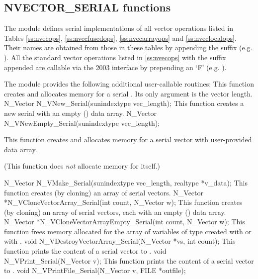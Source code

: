 \subsection{NVECTOR\_SERIAL functions}
\label{ss:nvec_ser_functions}

The {\nvecs} module defines serial implementations of all vector operations listed
in Tables \ref{ss:nvecops}, \ref{ss:nvecfusedops}, \ref{ss:nvecarrayops}
and \ref{ss:nveclocalops}. Their
names are obtained from those in these tables by appending the suffix 
(e.g. ).
All the standard vector operations listed in \ref{ss:nvecops} with the suffix
 appended are callable via the {\F} 2003 interface by prepending an
`F' (e.g. ).

The module {\nvecs} provides the following additional user-callable routines:
{
  This function creates and allocates memory for a serial .
  Its only argument is the vector length.
}
{
  N\_Vector N\_VNew\_Serial(sunindextype vec\_length);
}
{
  This function creates a new serial  with an empty ()
  data array.
}
{
  N\_Vector N\_VNewEmpty\_Serial(sunindextype vec\_length);
}
{
  This function creates and allocates memory for a serial vector
  with user-provided data array.

  (This function does {\em not} allocate memory for  itself.)
}
{
  N\_Vector N\_VMake\_Serial(sunindextype vec\_length, realtype *v\_data);
}
{
  This function creates (by cloning) an array of  serial vectors.
}
{
  N\_Vector *N\_VCloneVectorArray\_Serial(int count, N\_Vector w);
}
{
  This function creates (by cloning) an array of  serial vectors,
  each with an empty () data array.
}
{
  N\_Vector *N\_VCloneVectorArrayEmpty\_Serial(int count, N\_Vector w);
}
{
  This function frees memory allocated for the array of  variables of type
   created with  or with \newline
  .
}
{
  void N\_VDestroyVectorArray\_Serial(N\_Vector *vs, int count);
}
{
  This function prints the content of a serial vector to .
}
{
  void N\_VPrint\_Serial(N\_Vector v);
}
{
  This function prints the content of a serial vector to .
}
{
  void N\_VPrintFile\_Serial(N\_Vector v, FILE *outfile);
}

